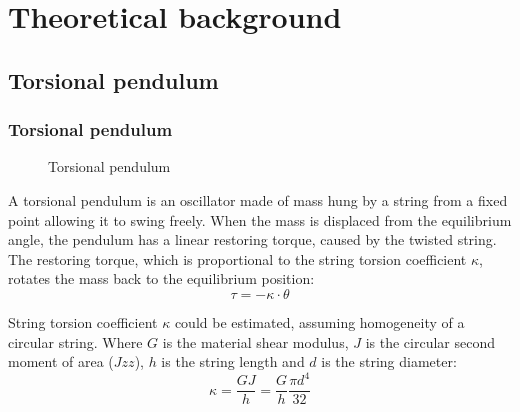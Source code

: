 \documentclass[\main/master.tex]{subfiles}
\begin{document}
\chapter{Theoretical background}\label{chapter:Theoretical background}


\section{Torsional pendulum}
\subsection{Torsional pendulum}
\begin{figure}[htbp]
	\centering
	\caption[Torsional pendulum]{Torsional pendulum}
	\label{fig:torsion_pendulum}
\end{figure}
\par\noindent
A torsional pendulum is an oscillator made of mass hung by a string from a fixed point allowing it to swing freely. When the mass is displaced from the equilibrium angle, the pendulum has a linear restoring torque, caused by the twisted string. The restoring torque, which is proportional to the string torsion coefficient $\kappa$, rotates the mass back to the equilibrium position:
\begin{equation}
\tau = -\kappa\cdot\theta     \label{eqn:undamped_motion_equation}
\end{equation}


\par\noindent
String torsion coefficient $\kappa$ could be estimated, assuming homogeneity of a circular string. Where $G$ is the material shear modulus, $J$ is the circular second moment of area ($Jzz$), $h$ is the string length and $d$ is the string diameter:
\begin{equation}
\kappa = \frac{GJ}{h} = \frac{G}{h} \frac{\pi d^4}{32}    \label{eqn:torsion_coefficient}
\end{equation}

 
\end{document}
